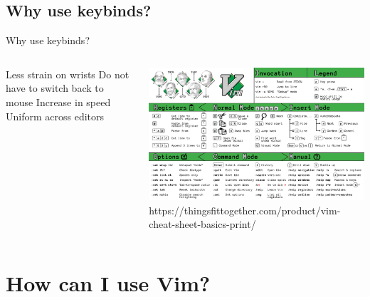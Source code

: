 \documentclass[12pt]{beamer}
\begin{document}
\subsection{Why use keybinds?}

\begin{frame}{Why use keybinds?}

    \begin{columns}
         \begin{outline}
            \1 Less strain on wrists
            \2 Do not have to switch back to mouse
            \1 Increase in speed
            \1 Uniform across editors
        \end{outline}

         \includegraphics[width=\linewidth]{Vim-Cheatsheet-2-Final-Draft.png}\\
        {\tiny 
        https://thingsfittogether.com/product/vim-cheat-sheet-basics-print/}

    \end{columns}
    
\end{frame}

\section{How can I use Vim?}
\end{document}

